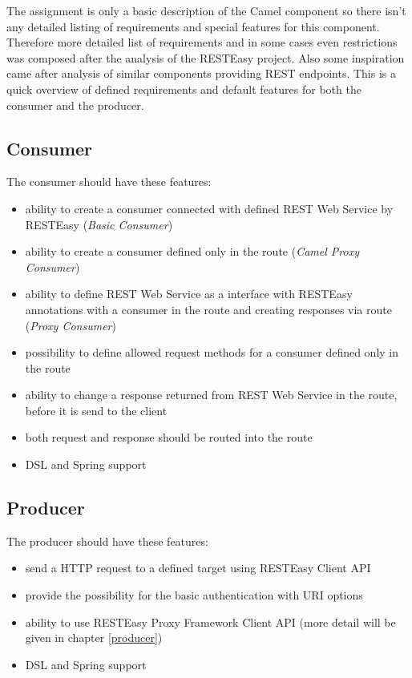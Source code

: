 \documentclass[12pt,final,oneside]{fithesis2}
\begin{document}
The assignment is only a basic description of the Camel component so there isn't any detailed listing of requirements and special features for this component. Therefore more detailed list of requirements and in some cases even restrictions was composed after the analysis of the RESTEasy project. Also some inspiration came after analysis of similar components providing REST endpoints. This is a quick overview of defined requirements and default features for both the consumer and the producer.

\subsection{Consumer}
The consumer should have these features:

\begin{itemize}
\item
ability to create a consumer connected with defined REST Web Service by RESTEasy (\textit{Basic Consumer})

\item
ability to create a consumer defined only in the route (\textit{Camel Proxy Consumer})

\item
ability to define REST Web Service as a interface with RESTEasy annotations with a consumer in the route and creating responses via route (\textit{Proxy Consumer})

\item
possibility to define allowed request methods for a consumer defined only in the route


\item
ability to change a response returned from REST Web Service in the route, before it is send to the client 

\item
both request and response should be routed into the route

\item
DSL and Spring support


\end{itemize}

\subsection{Producer}
The producer should have these features:
\begin{itemize}
\item
send a HTTP request to a defined target using RESTEasy Client API

\item
provide the possibility for the basic authentication with URI options

\item
ability to use RESTEasy Proxy Framework Client API (more detail will be given in chapter \ref{producer})

\item
DSL and Spring support
\end{itemize}
\end{document}
